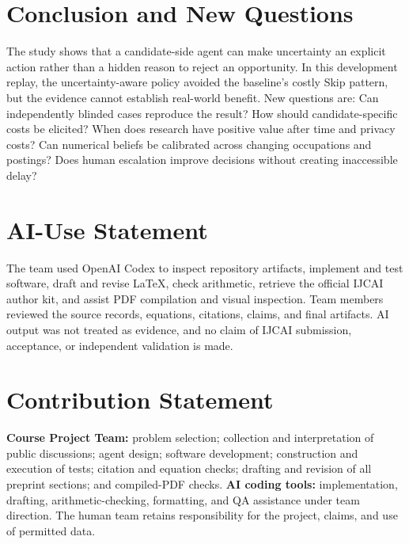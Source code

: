 \documentclass{article}
\begin{document}
\section{Conclusion and New Questions}
The study shows that a candidate-side agent can make uncertainty an explicit action rather than a hidden reason to reject an opportunity. In this development replay, the uncertainty-aware policy avoided the baseline's costly Skip pattern, but the evidence cannot establish real-world benefit. New questions are: Can independently blinded cases reproduce the result? How should candidate-specific costs be elicited? When does research have positive value after time and privacy costs? Can numerical beliefs be calibrated across changing occupations and postings? Does human escalation improve decisions without creating inaccessible delay?

\section*{AI-Use Statement}
The team used OpenAI Codex to inspect repository artifacts, implement and test software, draft and revise LaTeX, check arithmetic, retrieve the official IJCAI author kit, and assist PDF compilation and visual inspection. Team members reviewed the source records, equations, citations, claims, and final artifacts. AI output was not treated as evidence, and no claim of IJCAI submission, acceptance, or independent validation is made.

\section*{Contribution Statement}
\textbf{Course Project Team:} problem selection; collection and interpretation of public discussions; agent design; software development; construction and execution of tests; citation and equation checks; drafting and revision of all preprint sections; and compiled-PDF checks. \textbf{AI coding tools:} implementation, drafting, arithmetic-checking, formatting, and QA assistance under team direction. The human team retains responsibility for the project, claims, and use of permitted data.



\end{document}
